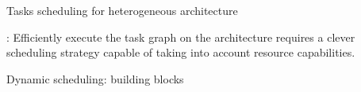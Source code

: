 \begin{frame}{Tasks scheduling for heterogeneous architecture}
  \vspace{0.5cm}

  : Efficiently execute the task
  graph on the architecture requires a clever \alert{scheduling}
  strategy capable of taking into account resource capabilities.
 
\end{frame}

\begin{frame}[t]{Dynamic scheduling: building blocks}
  
  \vspace{-0.5cm}

  \begin{center}
  \end{center}

  \vspace{-0.5cm}


\end{frame}

